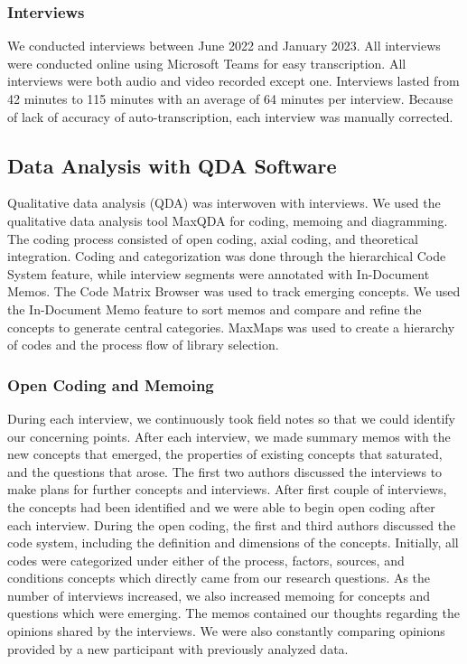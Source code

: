 \subsubsection{Interviews}
We conducted \numInterviews interviews between June 2022 and January 2023. All interviews were conducted online using Microsoft Teams for easy transcription. All interviews were both audio and video recorded except one. Interviews lasted from 42 minutes to 115 minutes with an average of 64 minutes per interview. Because of lack of accuracy of auto-transcription, each interview was manually corrected. %

\subsection{Data Analysis with QDA Software}
Qualitative data analysis (QDA) was interwoven with interviews. We used the qualitative data analysis tool MaxQDA
\cite{website:maxqda} for coding, memoing and diagramming. The coding process consisted of open coding, axial coding, and theoretical integration. Coding and categorization was done through the hierarchical Code System feature, while interview segments were annotated with In-Document Memos. The Code Matrix Browser was used to track emerging concepts. We used the In-Document Memo feature to sort memos and compare and refine the concepts to generate central categories. MaxMaps was used to create a hierarchy of codes and the process flow of library selection.

\subsubsection{Open Coding and Memoing} During each interview, we continuously took field notes so that we could identify our concerning points. After each interview, we made summary memos with the new concepts that emerged, the properties of existing concepts that saturated, and the questions that arose. The first two authors discussed the interviews to make plans for further concepts and interviews. After first couple of interviews, the concepts had been identified and we were able to begin open coding after each interview. During the open coding, the first and third authors discussed the code system, including the definition and dimensions of the concepts. Initially, all codes were categorized under either of the process, factors, sources, and conditions concepts which directly came from our research questions. As the number of interviews increased, we also increased memoing for concepts and questions which were emerging. The memos contained our thoughts regarding the opinions shared by the interviews. We were also constantly comparing opinions provided by a new participant with previously analyzed data. 

